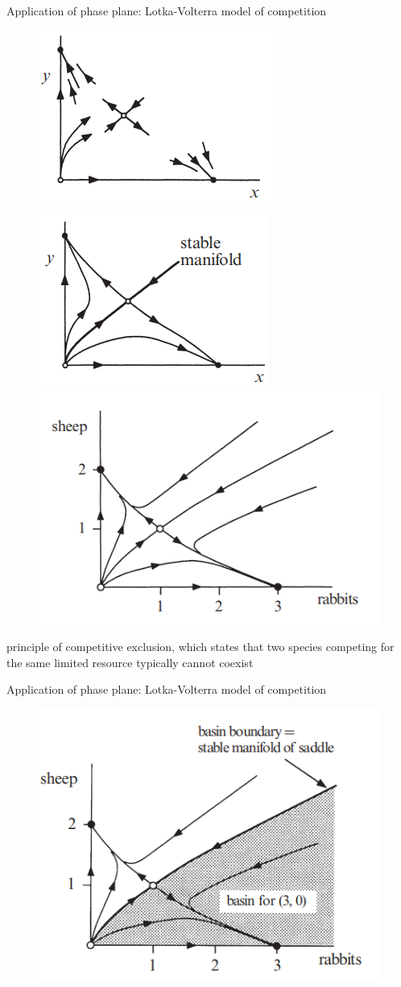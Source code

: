 \documentclass[9pt,aspectratio=43,mathserif,table]{beamer}
\begin{document}
\begin{frame}[label=current]{Application of phase plane: Lotka-Volterra model of competition}
\begin{multicols}{2}
    \begin{figure}[!h]
      \centering
      \includegraphics[width=.2\textwidth]{fig/6.4.5.png}
      \includegraphics[width=.2\textwidth]{fig/6.4.6.png}
      \includegraphics[width=.2\textwidth]{fig/6.4.7.png}
    \end{figure}

  principle of competitive exclusion, which states that two species competing for the same limited resource typically cannot coexist

   
  \end{multicols}


\end{frame}

\begin{frame}[label=current]{Application of phase plane: Lotka-Volterra model of competition}
    \begin{figure}[!h]
      \centering
      \includegraphics[width=.5\textwidth]{fig/6.5.8.png}
    \end{figure}
 
\end{frame}
\end{document}
